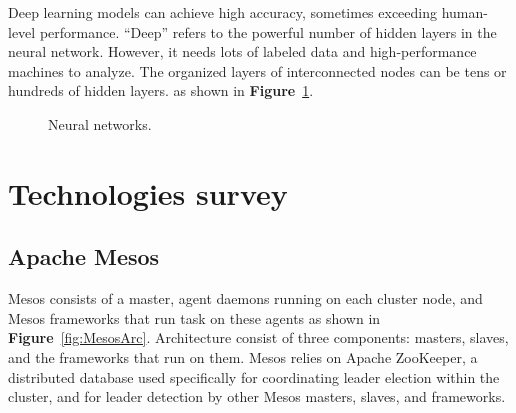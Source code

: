 \documentclass[12pt,oneside,openright,a4paper]{cpe-english-project}
\begin{document}
\hspace{10mm}Deep learning models can achieve high accuracy, sometimes exceeding human-level performance. “Deep” refers to the powerful number of hidden layers in the neural network.  However, it needs lots of labeled data and high-performance machines to analyze. The organized layers of interconnected nodes can be tens or hundreds of hidden layers. \cite{deepLearning2} as shown in \textbf{Figure}~\ref{fig:NN}.

\begin{figure}[!h]\centering
  \setlength{\fboxrule}{0mm} %
  \setlength{\fboxsep}{0cm}
  \caption{Neural networks.}\label{fig:NN}
\end{figure}

\newpage

\section{Technologies survey}  

\subsection{Apache Mesos}
\hspace{10mm}Mesos consists of a master, agent daemons running on each cluster node, and Mesos frameworks that run task on these agents as shown in \textbf{Figure}~\ref{fig:MesosArc}. Architecture consist of three components: masters, slaves, and the frameworks that run on them. Mesos relies on Apache ZooKeeper, a distributed database used specifically for coordinating leader election within the cluster, and for leader detection by other Mesos masters, slaves, and frameworks. \cite{mesosInAction}
\end{document}
